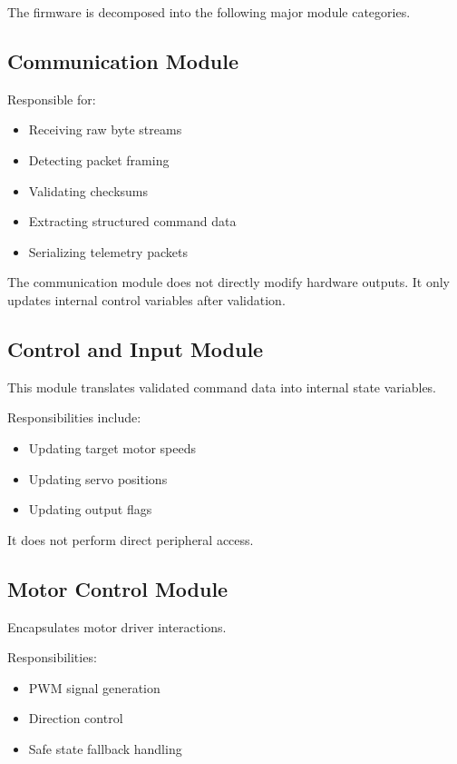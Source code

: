 The firmware is decomposed into the following major module categories.

\subsection{Communication Module}

Responsible for:

\begin{itemize}
	\item Receiving raw byte streams
	\item Detecting packet framing
	\item Validating checksums
	\item Extracting structured command data
	\item Serializing telemetry packets
\end{itemize}

The communication module does not directly modify hardware outputs.  
It only updates internal control variables after validation.


\subsection{Control and Input Module}

This module translates validated command data into internal state variables.

Responsibilities include:

\begin{itemize}
	\item Updating target motor speeds
	\item Updating servo positions
	\item Updating output flags
\end{itemize}

It does not perform direct peripheral access.


\subsection{Motor Control Module}

Encapsulates motor driver interactions.

Responsibilities:

\begin{itemize}
	\item PWM signal generation
	\item Direction control
	\item Safe state fallback handling
\end{itemize}


